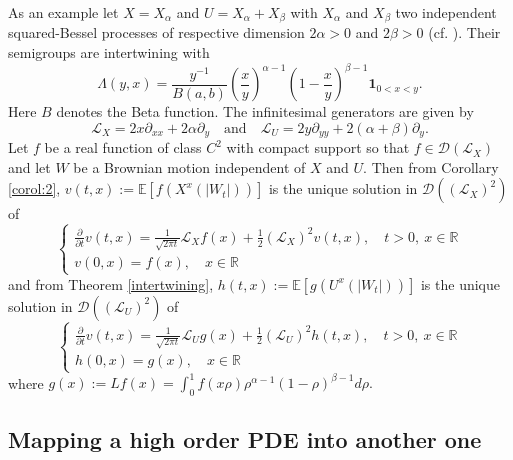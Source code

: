 \documentclass[a4paper, 11pt]{article}
\newcommand{\R}{\mathbb{R}}
\newcommand{\E}{\mathbb{E}}
\newcommand{\1}{\mathbf{1}}
\begin{document}
\noindent As an example let $X=X_\alpha$ and $U=X_\alpha+X_\beta$ with $X_\alpha$ and $X_\beta$ two independent squared-Bessel processes of respective dimension $2\alpha>0$ and $2\beta>0$ (cf. \cite{pal}). Their semigroups are intertwining with 
\begin{equation*}
\Lambda(y,x)=\frac{y^{-1}}{B(a,b)}\left(\frac{x}{y}\right)^{\alpha-1}\left(1-\frac{x}{y}\right)^{\beta-1}\1_{0<x<y}.
\end{equation*}
Here $B$ denotes the Beta function. The infinitesimal generators are given by
\begin{equation*}
\mathcal{L}_X=2x\partial_{xx}+2\alpha\partial_y\quad \text{and}\quad \mathcal{L}_U=2y\partial_{yy}+2(\alpha+\beta)\partial_y.
\end{equation*}
Let $f$ be a real function of class $C^2$ with compact support so that $f\in \mathcal{D}(\mathcal{L}_X)$ and let $W$ be a Brownian motion independent of $X$ and $U$. Then from Corollary \ref{corol:2}, $v(t,x):=\E \left[f(X^x(|W_t|))\right]$ is the unique solution in $\mathcal{D}((\mathcal{L}_X)^2)$ of
\begin{equation}
\begin{cases} 
\frac{\partial}{\partial t}v(t,x)=\frac{1}{\sqrt{2\pi t}}\mathcal{L}_Xf(x)+\frac{1}{2}(\mathcal{L}_X)^2v(t,x), \quad t>0,\ x\in\R\\
v(0,x)=f(x), \quad x\in\R
\end{cases}
\end{equation}
and from Theorem \ref{intertwining}, $h(t,x):=\E \left[g(U^x(|W_t|))\right]$ is the unique solution in $\mathcal{D}((\mathcal{L}_U)^2)$ of
\begin{equation}
\begin{cases} 

\frac{\partial}{\partial t}v(t,x)=\frac{1}{\sqrt{2\pi t}}\mathcal{L}_Ug(x)+\frac{1}{2}(\mathcal{L}_U)^2h(t,x), \quad t>0,\ x\in\R\\
h(0,x)=g(x), \quad x\in\R
\end{cases}
\end{equation}
where $g(x):=Lf(x)=\int_0^1f(x\rho)\rho^{\alpha-1}(1-\rho)^{\beta-1}d\rho.$




\subsection{Mapping a high order PDE into another one}

\medskip
\end{document}
